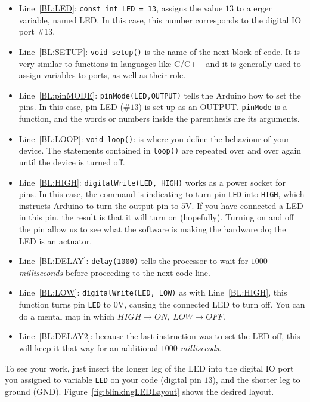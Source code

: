 \begin{itemize}
	\item Line~\ref{BL:LED}: \texttt{const int LED = 13}, assigns the value $13$ to a \texttt{\color{red}{int}}erger variable, named LED. In this case, this number corresponds to the digital IO port \#13.
	\item Line~\ref{BL:SETUP}: \texttt{void setup()} is the name of the next block of code. It is very similar to functions in languages like C/C++ and it is generally used to assign variables to ports, as well as their role.
	\item Line~\ref{BL:pinMODE}: \texttt{pinMode(LED,OUTPUT)} tells the Arduino how to set the pins. In this case, pin LED ($\#13$) is set up as an OUTPUT. \texttt{pinMode} is a function, and the words or numbers inside the parenthesis are its arguments.
	\item Line~\ref{BL:LOOP}: \texttt{void loop()}: is where you define the behaviour of your device. The statements contained in \texttt{loop()} are repeated over and over again until the device is turned off.
	\item Line~\ref{BL:HIGH}: \texttt{digitalWrite(LED, HIGH)} works as a power socket for pins. In this case, the command is indicating to turn pin \texttt{LED} into \texttt{HIGH}, which instructs Arduino to turn the output pin to $5$V. If you have connected a LED in this pin, the result is that it will turn on (hopefully). Turning on and off the pin allow us to see what the software is making the hardware do; the LED is an actuator.
	\item Line~\ref{BL:DELAY}: \texttt{delay(1000)} tells the processor to wait for $1000$ \emph{milliseconds} before proceeding to the next code line.
	\item Line~\ref{BL:LOW}: \texttt{digitalWrite(LED, LOW)} as with Line~\ref{BL:HIGH}, this function turns pin \texttt{LED} to $0$V, causing the connected LED to turn off. You can do a mental map in which $HIGH \rightarrow ON,\ LOW \rightarrow OFF$.
	\item Line~\ref{BL:DELAY2}: because the last instruction was to set the LED off, this will keep it that way for an additional $1000$ \emph{millisecods}.
\end{itemize}

To see your work, just insert the longer leg of the LED into the digital IO port you assigned to variable \texttt{LED} on your code (digital pin $13$), and the shorter leg to ground (GND). Figure~\ref{fig:blinkingLEDLayout} shows the desired layout.

